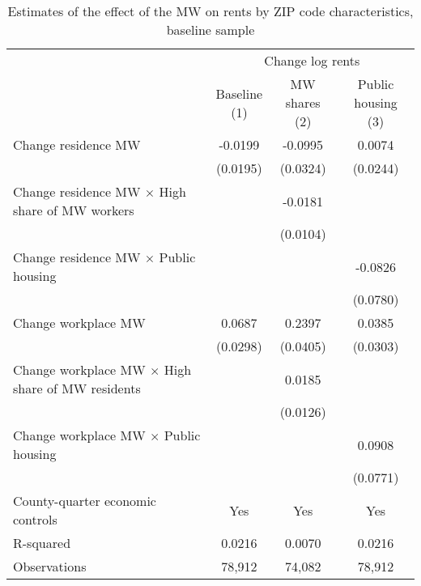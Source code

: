\begin{table}[hbt!] \centering
    \caption{Estimates of the effect of the MW on rents by ZIP code characteristics, baseline sample}
    \label{tab:heterogeneity}
    \begin{tabular}{@{}lccc@{}}
        \toprule
            & \multicolumn{3}{c}{Change log rents}                                                  \\ \cmidrule(l){2-4} 
            & \shortstack{Baseline\\(1)} 
            & \shortstack{MW shares\\(2)}                                             
            & \shortstack{Public housing\\(3)}                                                      \\ \midrule
        Change residence MW                                     &  -0.0199   &  -0.0995  &  0.0074   \\
                                                                & (0.0195)  & (0.0324) & (0.0244)  \\
        Change residence MW $\times$ High share of MW workers   &        &  -0.0181  &        \\
                                                                &        & (0.0104) &        \\
        Change residence MW $\times$ Public housing             &        &       &  -0.0826   \\
                                                                &        &       & (0.0780)  \\
        Change workplace MW                                     &  0.0687   &  0.2397  &  0.0385   \\
                                                                & (0.0298)  & (0.0405) & (0.0303)  \\
        Change workplace MW $\times$ High share of MW residents &        &  0.0185  &        \\
                                                                &        & (0.0126) &        \\
        Change workplace MW $\times$ Public housing             &        &       &  0.0908   \\
                                                                &        &       & (0.0771)  \\
        County-quarter economic controls                        &  Yes   &  Yes  &   Yes  \\
        R-squared                                               &  0.0216   &  0.0070  &   0.0216  \\
        Observations                                            &  78,912  &  74,082 &   78,912 \\ \bottomrule
    \end{tabular}


\end{table}
